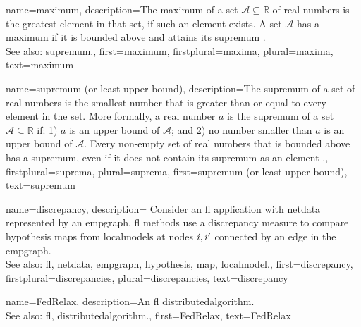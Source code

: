 {name=maximum,
     description={The maximum of a set $\mathcal{A} \subseteq \mathbb{R}$ 
     	of real numbers is the greatest element in that set, if such an element exists. A set $\mathcal{A}$ 
     	has a maximum if it is bounded above and attains its \gls{supremum} \cite[Sec.~1.4]{RudinBookPrinciplesMatheAnalysis}.
				\\ 
	See also: \gls{supremum}.},
 first={maximum},
 firstplural={maxima},
 plural={maxima},
 text={maximum}
}

{name=supremum (or least upper bound),
	description={The supremum of a set of real numbers is 
		the smallest number that is greater than or equal to every element in the set. More formally, a 
		real number $a$ is the supremum of a set $\mathcal{A} \subseteq \mathbb{R}$ if: 1) $a$ 
		is an upper bound of $\mathcal{A}$; and 2) no number smaller than $a$ is an upper bound of $\mathcal{A}$. 
		Every non-empty set of real numbers that is bounded above has a supremum, even if it does 
		not contain its supremum as an element \cite[Sec.~1.4]{RudinBookPrinciplesMatheAnalysis}.},
	firstplural={suprema}, 
  	plural={suprema},
	first={supremum (or least upper bound)},
	text={supremum}
}

{name={discrepancy},
	description={
		Consider an \gls{fl} application with \gls{netdata} 
		represented by an \gls{empgraph}. \gls{fl} methods use a discrepancy measure 
		to compare \gls{hypothesis} \glspl{map} from \glspl{localmodel} at nodes $i,i'$ 
		connected by an edge in the \gls{empgraph}.
					\\ 
		See also: \gls{fl}, \gls{netdata}, \gls{empgraph}, \gls{hypothesis}, \gls{map}, \gls{localmodel}.},
	first={discrepancy},
	firstplural={discrepancies}, 
  	plural={discrepancies}, 
	text={discrepancy}
}

{name={FedRelax},
	description={An \gls{fl} \gls{distributedalgorithm}. 
		\\ 
		See also: \gls{fl}, \gls{distributedalgorithm}.},
	first={FedRelax},
	text={FedRelax}
} 

